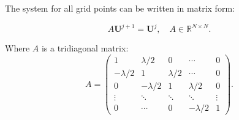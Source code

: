 \documentclass{article}
\begin{document}
The system for all grid points can be written in matrix form:

\[
A \mathbf{U}^{j+1} = \mathbf{U}^j,
\quad
A \in \mathbb{R}^{N \times N}.
\tag{H}
\]

Where $A$ is a tridiagonal matrix:
\[
A =
\begin{pmatrix}
1 & \lambda/2 & 0 & \cdots & 0 \\
-\lambda/2 & 1 & \lambda/2& \cdots & 0 \\
0 & -\lambda/2 & 1 & \lambda/2 & 0 \\
\vdots & \ddots & \ddots & \ddots & \vdots \\
0 & \cdots & 0 & -\lambda/2 & 1
\end{pmatrix}.
\]
\end{document}
